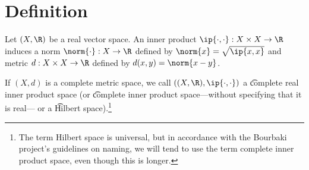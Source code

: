 
\section*{Definition}

Let $(X, \R )$ be a real vector space. An inner product $\ip{\cdot ,\cdot }: X\times  X \to \R $ induces a norm $\norm{\cdot }: X \to \R $ defined by $\norm{x} = \sqrt{\ip{x,x}}$ and metric $d: X \times  X \to \R $ defined by $d(x, y) = \norm{x - y}$.

If $(X, d)$ is a complete metric space, we call $((X, \R ), \ip{\cdot ,\cdot })$ a \t{complete real inner product space} (or \t{complete inner product space}---without specifying that it is real--- or a \t{Hilbert space}).\footnote{The term Hilbert space is universal, but in accordance with the Bourbaki project's guidelines on naming, we will tend to use the term complete inner product space, even though this is longer.}

\blankpage